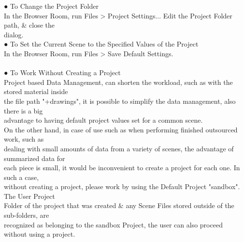 \documentclass[a4paper,10pt]{article}
\begin{document}
\noindent● To Change the Project Folder\\
\normalsize
In the Browser Room, run Files > Project Settings... Edit the Project Folder path, \& close the\\
dialog.\\
\large
● To Set the Current Scene to the Specified Values of the Project\\
\normalsize
In the Browser Room, run Files > Save Default Settings.\\
\\[0.5em]
\large
● To Work Without Creating a Project\\
\normalsize
Project based Data Management, can shorten the workload, such as with the stored material inside\\
the file path "+drawings", it is possible to simplify the data management, also there is a big\\
advantage to having default project values set for a common scene.\\
On the other hand, in case of use such as when performing finished outsourced work, such as\\
dealing with small amounts of data from a variety of scenes, the advantage of summarized data for\\
each piece is small, it would be inconvenient to create a project for each one. In such a case,\\
without creating a project, please work by using the Default Project "sandbox". The User Project\\
Folder of the project that was created \& any Scene Files stored outside of the sub-folders, are\\
recognized as belonging to the sandbox Project, the user can also proceed without using a project.\\
\end{document}
